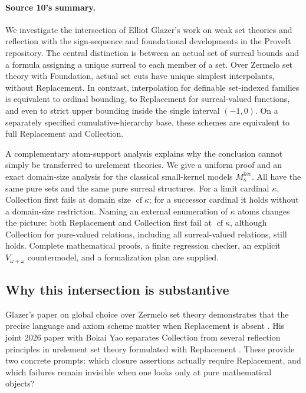 \documentclass[11pt,letterpaper]{article}
\theoremstyle{definition}
\theoremstyle{remark}
\newcommand{\cf}{\operatorname{cf}}
\newcommand{\Mker}{M^{\mathrm{ker}}}
\begin{document}
\paragraph{Source 10's summary.} We investigate the intersection of Elliot Glazer's work on weak set theories and reflection with the sign-sequence and foundational developments in the ProveIt repository. The central distinction is between an actual set of surreal bounds and a formula assigning a unique surreal to each member of a set. Over Zermelo set theory with Foundation, actual set cuts have unique simplest interpolants, without Replacement. In contrast, interpolation for definable set-indexed families is equivalent to ordinal bounding, to Replacement for surreal-valued functions, and even to strict upper bounding inside the single interval $(-1,0)$. On a separately specified cumulative-hierarchy base, these schemes are equivalent to full Replacement and Collection.

A complementary atom-support analysis explains why the conclusion cannot simply be transferred to urelement theories. We give a uniform proof and an exact domain-size analysis for the classical small-kernel models $\Mker_\kappa$. All have the same pure sets and the same pure surreal structures. For a limit cardinal $\kappa$, Collection first fails at domain size $\cf\kappa$; for a successor cardinal it holds without a domain-size restriction. Naming an external enumeration of $\kappa$ atoms changes the picture: both Replacement and Collection first fail at $\cf\kappa$, although Collection for pure-valued relations, including all surreal-valued relations, still holds. Complete mathematical proofs, a finite regression checker, an explicit $V_{\omega+\omega}$ countermodel, and a formalization plan are supplied.

\subsection{Why this intersection is substantive}
Glazer's paper on global choice over Zermelo set theory demonstrates that the precise language and axiom scheme matter when Replacement is absent \cite{GlazerChoice}. His joint 2026 paper with Bokai Yao separates Collection from several reflection principles in urelement set theory formulated with Replacement \cite{GlazerYao}. These provide two concrete prompts: which closure assertions actually require Replacement, and which failures remain invisible when one looks only at pure mathematical objects?
\end{document}
